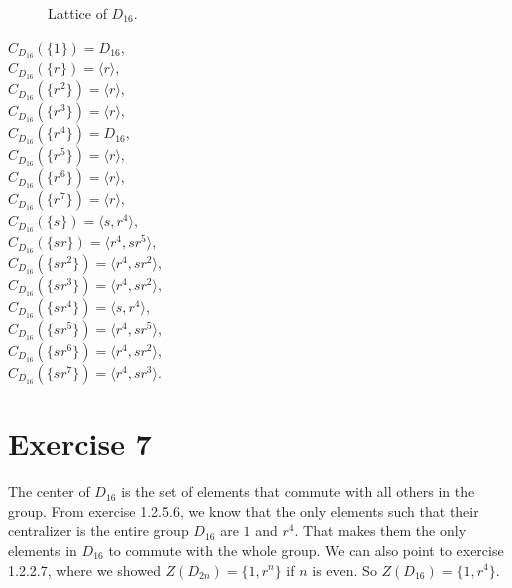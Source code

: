 \documentclass[12pt]{article}
\begin{document}
\begin{enumerate}[label=\textbf{\alph*.}]
\begin{figure}[H]
        
                \caption{\label{fig:figure1} Lattice of $D_{16}$.}
            \end{figure} 
                
            $C_{D_{16}}(\{1\}) = D_{16}$, \\
            $C_{D_{16}}(\{r\}) = \langle r \rangle$, \\
            $C_{D_{16}}(\{r^2\}) = \langle r \rangle$, \\
            $C_{D_{16}}(\{r^3\}) = \langle r \rangle$, \\
            $C_{D_{16}}(\{r^4\}) = D_{16}$, \\
            $C_{D_{16}}(\{r^5\}) = \langle r \rangle$, \\
            $C_{D_{16}}(\{r^6\}) = \langle r \rangle$, \\
            $C_{D_{16}}(\{r^7\}) = \langle r \rangle$, \\
            $C_{D_{16}}(\{s\}) = \langle s, r^4 \rangle$, \\
            $C_{D_{16}}(\{sr\}) = \langle r^4, sr^5 \rangle$, \\
            $C_{D_{16}}(\{sr^2\}) = \langle r^4, sr^2 \rangle$, \\
            $C_{D_{16}}(\{sr^3\}) = \langle r^4, sr^2 \rangle$, \\
            $C_{D_{16}}(\{sr^4\}) = \langle s, r^4 \rangle$, \\
            $C_{D_{16}}(\{sr^5\}) = \langle r^4, sr^5 \rangle$, \\
            $C_{D_{16}}(\{sr^6\}) = \langle r^4, sr^2 \rangle$, \\
            $C_{D_{16}}(\{sr^7\}) = \langle r^4, sr^3 \rangle$.  
    \end{enumerate}


    \section*{Exercise 7}
    The center of $D_{16}$ is the set of elements 
    that commute with all others in the group.
    From exercise 1.2.5.6, we know that the only elements
    such that their centralizer is the entire group $D_{16}$
    are $1$ and $r^4$.
    That makes them the only elements in $D_{16}$ to commute
    with the whole group.
    We can also point to exercise 1.2.2.7,
    where we showed $Z(D_{2n}) = \{1, r^n\}$ if $n$ is even.
    So $Z(D_{16}) = \{1, r^4\}$.
\end{document}
